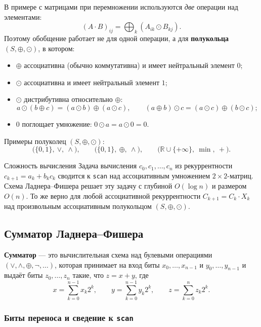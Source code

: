 \begin{Remark}{}{}
	В примере с матрицами при перемножении используются \emph{две} операции над элементами:
	\[
	(A \cdot B)_{ij} = \bigoplus_k (A_{ik} \odot B_{kj}).
	\]
	Поэтому обобщение работает не для одной операции, а для \textbf{полукольца} $(S, \oplus, \odot)$, в котором:
	\begin{itemize}
		\item $\oplus$ ассоциативна (обычно коммутативна) и имеет нейтральный элемент $0$;
		\item $\odot$ ассоциативна и имеет нейтральный элемент $1$;
		\item $\odot$ дистрибутивна относительно $\oplus$:
		\[
		a \odot (b \oplus c) = (a \odot b) \oplus (a \odot c), \qquad
		(a \oplus b) \odot c = (a \odot c) \oplus (b \odot c);
		\]
		\item $0$ поглощает умножение: $0 \odot a = a \odot 0 = 0$.
	\end{itemize}
	Примеры полуколец $(S, \oplus, \odot)$:
	\[
	\bigl(\{0,1\},\ \vee,\ \wedge\bigr), \qquad
	\bigl(\{0,1\},\ \oplus,\ \wedge\bigr), \qquad
	\bigl(\mathbb{R} \cup \{+\infty\},\ \min,\ +\bigr).
	\]
\end{Remark}

\begin{Statement}{Сложность вычисления}{}
	Задача вычисления $c_0, c_1, \dots, c_n$ из рекуррентности $c_{k+1} = a_k + b_k c_k$
	сводится к \texttt{scan} над ассоциативным умножением $2{\times}2$-матриц.
	Схема Ладнера--Фишера решает эту задачу с глубиной $O(\log n)$ и размером $O(n)$.
	То же верно для любой ассоциативной рекуррентности
	$C_{k+1} = C_k \cdot X_k$ над произвольным ассоциативным полукольцом $(S,\oplus,\odot)$.
\end{Statement}

\subsection{Сумматор Ладнера–Фишера}

\begin{Definition}{}{}
	\textbf{Сумматор} — это вычислительная схема над булевыми операциями $(\vee, \wedge, \oplus, \neg, \dots)$, которая принимает на вход биты $x_0, \dots, x_{n-1}$ и $y_0, \dots, y_{n-1}$ и выдаёт биты $z_0, \dots, z_n$ такие, что $z = x + y$, где
	\[
	x = \sum_{k=0}^{n-1} x_k 2^k, \qquad
	y = \sum_{k=0}^{n-1} y_k 2^k, \qquad
	z = \sum_{k=0}^{n} z_k 2^k.
	\]
\end{Definition}

\subsubsection*{Биты переноса и сведение к \texttt{scan}}

